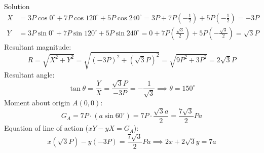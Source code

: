\begin{proofbox}{Solution}
\begin{align*}
    X &= 3P\cos 0^\circ + 7P\cos 120^\circ + 5P\cos 240^\circ = 3P + 7P\left(-\frac{1}{2}\right) + 5P\left(-\frac{1}{2}\right) = -3P \\
    Y &= 3P\sin 0^\circ + 7P\sin 120^\circ + 5P\sin 240^\circ = 0 + 7P\left(\frac{\sqrt{3}}{2}\right) + 5P\left(-\frac{\sqrt{3}}{2}\right) = \sqrt{3}P
\end{align*}
Resultant magnitude:
\begin{equation*}
    R = \sqrt{X^2 + Y^2} = \sqrt{(-3P)^2 + (\sqrt{3}P)^2} = \sqrt{9P^2 + 3P^2} = 2\sqrt{3}P
\end{equation*}
Resultant angle:
\begin{equation*}
    \tan\theta = \frac{Y}{X} = \frac{\sqrt{3}P}{-3P} = -\frac{1}{\sqrt{3}} \implies \theta = 150^\circ
\end{equation*}
Moment about origin $A(0,0)$:
\begin{equation*}
    G_A = 7P \cdot (a\sin 60^\circ) = 7P \cdot \frac{\sqrt{3}a}{2} = \frac{7\sqrt{3}}{2}Pa
\end{equation*}
Equation of line of action ($xY - yX = G_A$):
\begin{equation*}
    x(\sqrt{3}P) - y(-3P) = \frac{7\sqrt{3}}{2}Pa \implies 2x + 2\sqrt{3}y = 7a
\end{equation*}
\end{proofbox}

